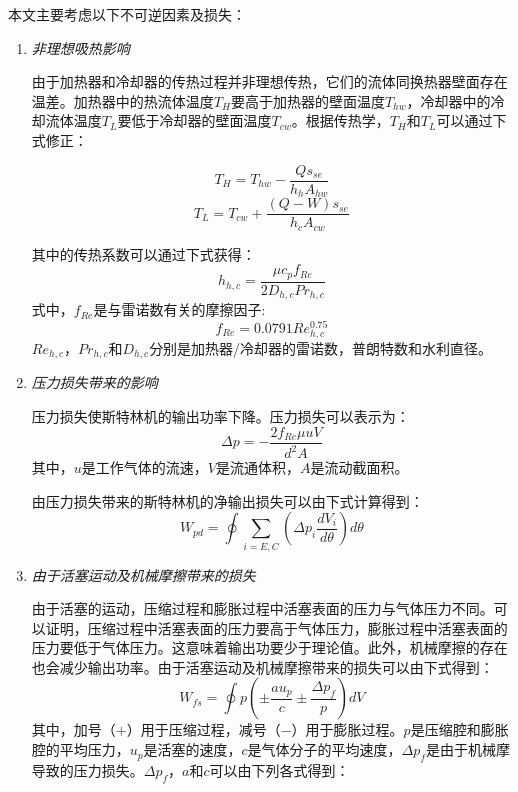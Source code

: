 本文主要考虑以下不可逆因素及损失：
\begin{enumerate}[label=(\arabic*)]
\item \emph{非理想吸热影响}

\setlength\parindent{2em}
由于加热器和冷却器的传热过程并非理想传热，它们的流体同换热器壁面存在温差。加热器中的热流体温度$T_{H}$要高于加热器的壁面温度$T_{hw}$，冷却器中的冷却流体温度$T_L$要低于冷却器的壁面温度$T_{cw}$。根据传热学，$T_{H}$和$T_{L}$可以通过下式修正：

\begin{equation}
	T_H = T_{hw} - \frac{Qs_{se}}{h_hA_{hw}}
	\label{eq:T_H}
\end{equation}
\begin{equation}
	T_L = T_{cw} + \frac{(Q-W)s_{se}}{h_cA_{cw}}
	\label{eq:T_L}
\end{equation}

其中的传热系数可以通过下式获得\cite{Babaelahi2015}：
\begin{equation}
	h_{h,c} = \frac{\mu c_pf_{Re}}{2D_{h,c}Pr_{h,c}}
\end{equation}
式中，$f_{Re}$是与雷诺数有关的摩擦因子:
\begin{equation}
	f_{Re} = 0.0791Re_{h,c}^{0.75}
\end{equation}
$Re_{h,c}$，$Pr_{h,c}$和$D_{h,c}$分别是加热器/冷却器的雷诺数，普朗特数和水利直径。

\item \emph{压力损失带来的影响}

压力损失使斯特林机的输出功率下降。压力损失可以表示为\cite{Urieli1984}：
\begin{equation}
	\Delta p = -\frac{2f_{Re}\mu u V}{d^2A}
\end{equation}
其中，$u$是工作气体的流速，$V$是流通体积，$A$是流动截面积。

由压力损失带来的斯特林机的净输出损失可以由下式计算得到：
\begin{equation}
	W_{pd} = \oint\underset{i = E,C}{\sum}(\Delta p_{i}\frac{dV_i}{d\theta})d\theta
\end{equation}

\item \emph{由于活塞运动及机械摩擦带来的损失}

由于活塞的运动，压缩过程和膨胀过程中活塞表面的压力与气体压力不同。可以证明，压缩过程中活塞表面的压力要高于气体压力，膨胀过程中活塞表面的压力要低于气体压力。这意味着输出功要少于理论值。此外，机械摩擦的存在也会减少输出功率。由于活塞运动及机械摩擦带来的损失可以由下式得到\cite{Babaelahi2015}：
\begin{equation}
	W_{fs} = \oint p(\pm\frac{au_p}{c}\pm\frac{\Delta p_f}{p})dV
\end{equation}
其中，加号（$+$）用于压缩过程，减号（$-$）用于膨胀过程。$p$是压缩腔和膨胀腔的平均压力，$u_p$是活塞的速度，$c$是气体分子的平均速度，$\Delta p_f$是由于机械摩导致的压力损失。$\Delta p_f$，$a$和$c$可以由下列各式得到\cite{Heywood1988}：


\end{enumerate}
